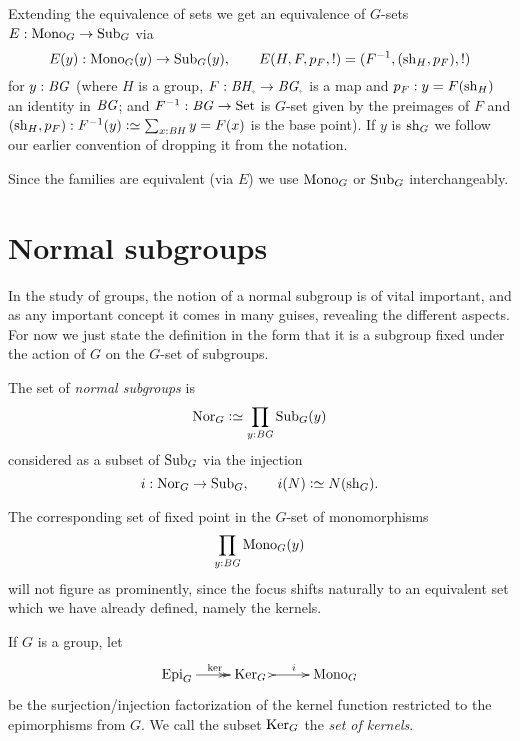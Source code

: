 Extending the equivalence of sets we get an equivalence of $G$-sets $E:\mathrm{Mono}_G\to\mathrm{Sub}_G$ via
$$E(y):\mathrm{Mono}_G(y)\to\mathrm{Sub}_G(y),\qquad E(H,F,p_F,!)=(F^{-1}, (\mathrm{sh}_H,p_F),!)
$$
for $y:\mathit{B}\mathit{G}$ (where $H$ is a group, $F:\BH_\div\to \BG_\div$ is a map and $p_F:y=F(\mathrm{sh}_H)$ an identity in $\mathit{B}\mathit{G}$; and $F^{-1}:\mathit{B}\mathit{G}\to\mathrm{Set}$ is $G$-set given by the preimages of $F$ and $(\sh_H,p_F):F^{-1}(y)\defequi \sum_{x:\BH}y=F(x)$ is the base point).  If $y$ is $\mathrm{sh}_G$ we follow our earlier convention of dropping it from the notation.


Since the families are equivalent (via $E$) we use $\mathrm{Mono}_G$ or $\mathrm{Sub}_G$ interchangeably.

\section{Normal subgroups}
\label{sec:normal}
In the study of groups, the notion of a normal subgroup is of vital important, and as any important concept it comes in many guises, revealing the different aspects.
For now we just state the definition in the form that it is a subgroup fixed under the action of $G$ on the $G$-set of subgroups.
\begin{definition}
  \label{def:normalsubgroup}
  The set of \emph{normal subgroups} is
  $$\typenormal_G\defequi\prod_{y:\BG}\typesubgroup_G(y)$$
  considered as a subset of $\mathrm{Sub}_G$ via the injection
  $$i:\typenormal_G\to\typesubgroup_G,\qquad i(N)\defequi N(\sh_G).$$
\end{definition}

  The corresponding set of fixed point in the $G$-set of monomorphisms
  $$\prod_{y:\mathit{B}\mathit{G}}\mathrm{Mono}_G(y)$$
will not figure as prominently, since the focus shifts naturally to an equivalent set which we have already defined, namely the kernels.
  \begin{definition}
    \label{def:setofkernels}
    If $G$ is a group, let
    $$\xymatrix{\typeepi_G\ar@{->>}[r]^{\ker}&\typekernel_G\,\,\ar@{>->}[r]^i&\typemono_G}$$
    be the surjection/injection factorization of the kernel function restricted to the epimorphisms from $G$.  We call the subset ${\mathrm{Ker}}_G$ the \emph{set of kernels}.
  \end{definition}

